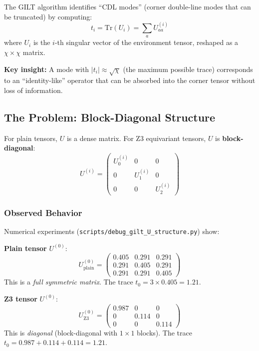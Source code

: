 \documentclass{article}
\begin{document}
The GILT algorithm identifies ``CDL modes'' (corner double-line modes that can be truncated) by computing:
\begin{equation}
    t_i = \text{Tr}(U_i) = \sum_a U^{(i)}_{aa}
\end{equation}
where $U_i$ is the $i$-th singular vector of the environment tensor, reshaped as a $\chi \times \chi$ matrix.

\textbf{Key insight:} A mode with $|t_i| \approx \sqrt{\chi}$ (the maximum possible trace) corresponds to an ``identity-like'' operator that can be absorbed into the corner tensor without loss of information.

\subsection{The Problem: Block-Diagonal Structure}

For plain tensors, $U$ is a dense matrix. For Z3 equivariant tensors, $U$ is \textbf{block-diagonal}:
\begin{equation}
    U^{(i)} = \begin{pmatrix} U^{(i)}_0 & 0 & 0 \\ 0 & U^{(i)}_1 & 0 \\ 0 & 0 & U^{(i)}_2 \end{pmatrix}
\end{equation}

\subsubsection{Observed Behavior}

Numerical experiments (\texttt{scripts/debug\_gilt\_U\_structure.py}) show:

\textbf{Plain tensor} $U^{(0)}$:
\begin{equation}
    U^{(0)}_{\text{plain}} = \begin{pmatrix} 0.405 & 0.291 & 0.291 \\ 0.291 & 0.405 & 0.291 \\ 0.291 & 0.291 & 0.405 \end{pmatrix}
\end{equation}
This is a \textit{full symmetric matrix}. The trace $t_0 = 3 \times 0.405 = 1.21$.

\textbf{Z3 tensor} $U^{(0)}$:
\begin{equation}
    U^{(0)}_{\text{Z3}} = \begin{pmatrix} 0.987 & 0 & 0 \\ 0 & 0.114 & 0 \\ 0 & 0 & 0.114 \end{pmatrix}
\end{equation}
This is \textit{diagonal} (block-diagonal with $1 \times 1$ blocks). The trace $t_0 = 0.987 + 0.114 + 0.114 = 1.21$.
\end{document}
